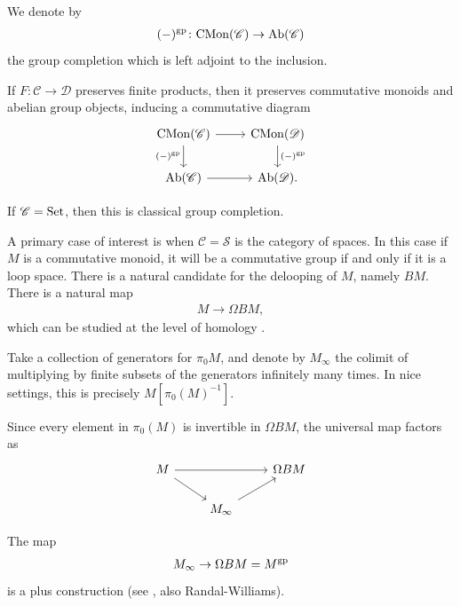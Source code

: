 \documentclass[11pt,openany]{book}
\begin{document}
We denote by
\begin{align*}
    (-)^{\mathrm{gp}} \colon \mathrm{CMon}(\mathscr{C}) \to \mathrm{Ab}(\mathscr{C})
\end{align*}
the group completion which is left adjoint to the inclusion.

\begin{proposition} If $F \colon \mathscr{C} \to \mathscr{D}$ preserves finite products, then it preserves commutative monoids and abelian group objects, inducing a commutative diagram
\[\begin{tikzcd}
    \CMon(\mathscr{C})\rar\dar["{(-)^\gp}" left] & \CMon(\mathscr{D})\dar["{(-)^\gp}" right]\\
    \Ab(\mathscr{C})\rar & \Ab(\mathscr{D}).
\end{tikzcd} \]
\end{proposition}


\begin{example} If $\mathscr{C} = \mathrm{Set}$, then this is classical group completion.
\end{example}

A primary case of interest is when $\mathscr{C} = \mathcal{S}$ is the category of spaces. In this case if $M$ is a commutative monoid, it will be a commutative group if and only if it is a loop space. There is a natural candidate for the delooping of $M$, namely $BM$. There is a natural map
\begin{align*}
    M \to \Omega BM,
\end{align*}
which can be studied at the level of homology \cite{McDuffSegal,Nikolaus-gp}.

\begin{definition} Take a collection of generators for $\pi_0 M$, and denote by $M_\infty$ the colimit of multiplying by finite subsets of the generators infinitely many times. In nice settings, this is precisely $M \left[ \pi_0(M)^{-1} \right]$.
\end{definition}

Since every element in $\pi_0(M)$ is invertible in $\Omega B M$, the universal map factors as
\[ \begin{tikzcd}
    M\ar[rr]\ar[dr] &  & \Omega B M\\
     & M_\infty\ar[ur] & 
\end{tikzcd} \]

\begin{theorem} The map
\begin{align*}
    M_\infty \to \Omega BM = M^{\mathrm{gp}}
\end{align*}
is a plus construction (see \cite[Theorem~9]{Nikolaus-gp}, also Randal-Williams).
\end{theorem}
\end{document}
